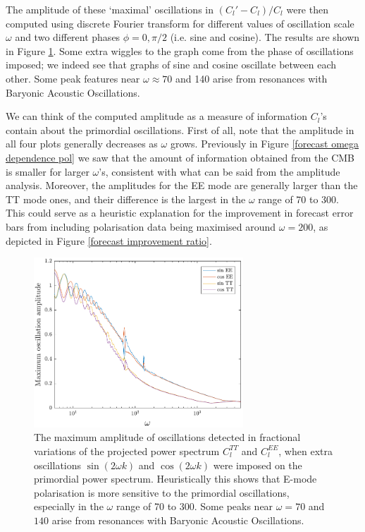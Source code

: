 The amplitude of these `maximal' oscillations in $(C_l'-C_l)/C_l$ were then computed using discrete Fourier transform for different values of oscillation scale $\omega$ and two different phases $\phi=0,\pi/2$ (i.e. sine and cosine). The results are shown in Figure \ref{insight feature plot}. Some extra wiggles to the graph come from the phase of oscillations imposed; we indeed see that graphs of sine and cosine oscillate between each other. Some peak features near $\omega\approx70$ and 140 arise from resonances with Baryonic Acoustic Oscillations.

We can think of the computed amplitude as a measure of information $C_l$'s contain about the primordial oscillations. First of all, note that the amplitude in all four plots generally decreases as $\omega$ grows. Previously in Figure \ref{forecast omega dependence pol} we saw that the amount of information obtained from the CMB is smaller for larger $\omega$'s, consistent with what can be said from the amplitude analysis. Moreover, the amplitudes for the EE mode are generally larger than the TT mode ones, and their difference is the largest in the $\omega$ range of 70 to 300. This could serve as a heuristic explanation for the improvement in forecast error bars from including polarisation data being maximised around $\omega=200$, as depicted in Figure \ref{forecast improvement ratio}.

\begin{figure}[ht]
	\centering
	\includegraphics[width=0.7\textwidth]{feature_plot.pdf}
	\caption{The maximum amplitude of oscillations detected in fractional variations of the projected power spectrum $C_l^{TT}$ and $C_l^{EE}$, when extra oscillations $\sin(2\omega k)$ and $\cos(2\omega k)$ were imposed on the primordial power spectrum. Heuristically this shows that E-mode polarisation is more sensitive to the primordial oscillations, especially in the $\omega$ range of 70 to 300. Some peaks near $\omega=70$ and $140$ arise from resonances with Baryonic Acoustic Oscillations. }
	\label{insight feature plot}
\end{figure}


